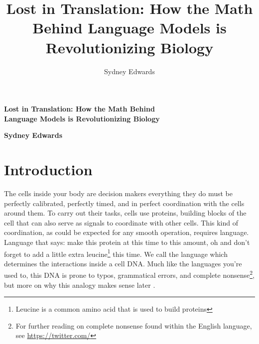 \documentclass{SBCbookchapter}
\author{Sydney Edwards}
\title{Lost in Translation: How the Math Behind Language Models is Revolutionizing Biology}
\makeatletter
\renewcommand{\maketitle}{%
	\noindent%
}
\makeatother
\begin{document}
\newcommand*{\getTitleGer}{\noindent Lost in Translation: How the Math Behind \\ Language Models is Revolutionizing Biology}

\newcommand*{\getauthor}{\noindent Sydney Edwards}

\makeatletter

\vspace{4cm}
{\fontsize{\@xxpt}{23}\selectfont \bfseries \getTitleGer \par}

\vspace{0.5cm}
{\fontsize{16}\selectfont \bfseries \getauthor\par}

\maketitle

\bigskip
\bigskip
\bigskip 

\onehalfspacing

\section{Introduction}

\par The cells inside your body are decision makers \textemdash everything they do must be perfectly calibrated, perfectly timed, and in perfect coordination with the cells around them. To carry out 
their tasks, cells use proteins, building blocks of the cell that can also serve as signals to coordinate with other cells. This kind of coordination, as could be expected for any smooth operation, 
requires language. Language that says: make this protein at this time to this amount, oh and don’t forget to add a little extra leucine\footnote{Leucine is a common amino acid that is used to build 
proteins} this time. We call the language which determines the interactions inside a cell DNA. Much like the languages you’re used to, this DNA is prone to typos, grammatical errors, and complete 
nonsense\footnote{For further reading on complete nonsense found within the English language, see \url{https://twitter.com/}}, but more on why this analogy makes sense later \cite{ferruz_towards_2022}. 
\end{document}
